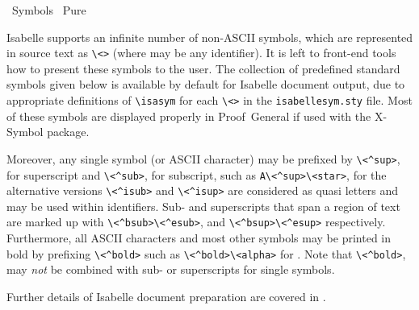%
\begin{isabellebody}%
\def\isabellecontext{Symbols}%
%
\isadelimtheory
\isanewline
\isanewline
%
\endisadelimtheory
%
\isatagtheory
{}\isamarkupfalse%
\ Symbols\isanewline
{}\ Pure\isanewline
{}%
\endisatagtheory
{\isafoldtheory}%
%
\isadelimtheory
%
\endisadelimtheory
%
\isamarkuptrue%
%
\begin{isamarkuptext}%
Isabelle supports an infinite number of non-ASCII symbols, which are
  represented in source text as \verb|\|\verb|<|\verb|>| (where  may be any identifier).  It
  is left to front-end tools how to present these symbols to the user.
  The collection of predefined standard symbols given below is
  available by default for Isabelle document output, due to
  appropriate definitions of \verb|\|\verb|isasym| for each \verb|\|\verb|<|\verb|>| in the \verb|isabellesym.sty| file.  Most of these symbols
  are displayed properly in Proof~General if used with the X-Symbol
  package.

  Moreover, any single symbol (or ASCII character) may be prefixed by
  \verb|\|\verb|<^sup>|, for superscript and \verb|\|\verb|<^sub>|, for subscript, such as \verb|A\|\verb|<^sup>\<star>|, for  the alternative
  versions \verb|\|\verb|<^isub>| and \verb|\|\verb|<^isup>| are considered as quasi letters and may
  be used within identifiers.  Sub- and superscripts that span a
  region of text are marked up with \verb|\|\verb|<^bsub>|\isa{{\isachardoublequote}{\isasymdots}{\isachardoublequote}}\verb|\|\verb|<^esub>|, and
  \verb|\|\verb|<^bsup>|\isa{{\isachardoublequote}{\isasymdots}{\isachardoublequote}}\verb|\|\verb|<^esup>| respectively.  Furthermore, all ASCII
  characters and most other symbols may be printed in bold by
  prefixing \verb|\|\verb|<^bold>| such as \verb|\|\verb|<^bold>\|\verb|<alpha>| for \isa{{\isachardoublequote}\isactrlbold {\isasymalpha}{\isachardoublequote}}.  Note that \verb|\|\verb|<^bold>|, may
  \emph{not} be combined with sub- or superscripts for single symbols.

  Further details of Isabelle document preparation are covered in
  .

  \begin{center}
  \begin{isabellebody}
    
  \end{isabellebody}
  \end{center}%
\end{isamarkuptext}%
\isamarkuptrue%
%
\isadelimtheory
%
\endisadelimtheory
%
\isatagtheory
{}\isamarkupfalse%
%
\endisatagtheory
{\isafoldtheory}%
%
\isadelimtheory
%
\endisadelimtheory
\end{isabellebody}%

